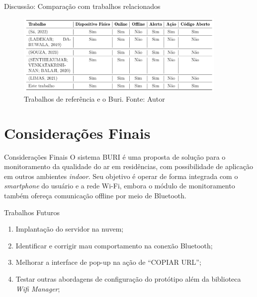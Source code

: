 \documentclass[12pt]{beamer}
\begin{document}
    \begin{frame}{Discussão: Comparação com trabalhos relacionados}
        \begin{figure}[ht]
            \centering
            \includegraphics[width=0.90\textwidth]{./img/comparacao-trabalho.png}
            \caption{Trabalhos de referência e o Buri. Fonte: Autor}\label{fig:buriTRab}
        \end{figure}
    \end{frame}

    \section{Considerações Finais}

    \begin{frame}{Considerações Finais}
        O sistema BURI é uma proposta de solução para o monitoramento da qualidade do
        ar em residências, com possibilidade de aplicação em outros ambientes \textit{indoor}. Seu objetivo é
        operar de forma integrada com o \textit{smartphone} do usuário e a rede Wi-Fi, embora o módulo de
        monitoramento também ofereça comunicação offline por meio de Bluetooth. 
    \end{frame}

    \begin{frame}{Trabalhos Futuros}
        \begin{enumerate}
            \item Implantação do servidor na nuvem;
            \item Identificar e corrigir mau comportamento na conexão Bluetooth;
            \item Melhorar a interface de pop-up na ação de ``COPIAR URL'';
            \item Testar outras abordagens de configuração do protótipo além da biblioteca \textit{Wifi Manager};
        \end{enumerate}
    \end{frame}
\end{document}
